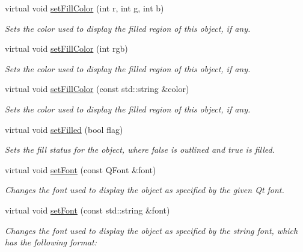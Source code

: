 \begin{DoxyCompactItemize}
virtual void \mbox{\hyperlink{classsgl_1_1GObject_ad767a33971159e9493e221cca4c00ae9}{set\+Fill\+Color}} (int r, int g, int b)
\begin{DoxyCompactList}\small\item\em Sets the color used to display the filled region of this object, if any. \end{DoxyCompactList}\item 
virtual void \mbox{\hyperlink{classsgl_1_1GObject_aa59d9775a67fa7df2b24a95cd34840a3}{set\+Fill\+Color}} (int rgb)
\begin{DoxyCompactList}\small\item\em Sets the color used to display the filled region of this object, if any. \end{DoxyCompactList}\item 
virtual void \mbox{\hyperlink{classsgl_1_1GObject_adbc18b1a930aadd97d7437f9f7265b96}{set\+Fill\+Color}} (const std\+::string \&color)
\begin{DoxyCompactList}\small\item\em Sets the color used to display the filled region of this object, if any. \end{DoxyCompactList}\item 
virtual void \mbox{\hyperlink{classsgl_1_1GObject_a9b82b53362282c6bb7d6947068d2e55b}{set\+Filled}} (bool flag)
\begin{DoxyCompactList}\small\item\em Sets the fill status for the object, where {\ttfamily false} is outlined and {\ttfamily true} is filled. \end{DoxyCompactList}\item 
virtual void \mbox{\hyperlink{classsgl_1_1GObject_a2592348886ffea646c6534bf88f7c49d}{set\+Font}} (const Q\+Font \&font)
\begin{DoxyCompactList}\small\item\em Changes the font used to display the object as specified by the given Qt font. \end{DoxyCompactList}\item 
virtual void \mbox{\hyperlink{classsgl_1_1GObject_a8e096e8818d838aceae1d46d58fb3a7b}{set\+Font}} (const std\+::string \&font)
\begin{DoxyCompactList}\small\item\em Changes the font used to display the object as specified by the string {\ttfamily font}, which has the following format\+: \end{DoxyCompactList}\item 

\end{DoxyCompactItemize}
